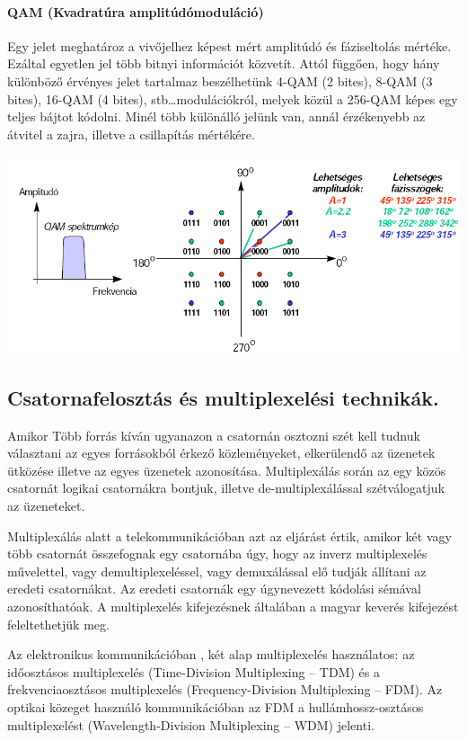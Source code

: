 \paragraph{QAM (Kvadratúra amplitúdómoduláció)}
Egy jelet meghatároz a vivőjelhez képest mért amplitúdó és fáziseltolás mértéke. Ezáltal egyetlen jel több bitnyi információt közvetít. Attól függően, hogy hány különböző érvényes jelet tartalmaz beszélhetünk 4-QAM (2 bites), 8-QAM (3 bites), 16-QAM (4 bites), stb\dots modulációkról, melyek közül a 256-QAM képes egy teljes bájtot kódolni. Minél több különálló jelünk van, annál érzékenyebb az átvitel a zajra, illetve a csillapítás mértékére.
\begin{center}
	\includegraphics[width=0.7\linewidth]{fig/12-QAM}
\end{center}


\subsection{Csatornafelosztás és multiplexelési technikák.}
Amikor Több forrás kíván ugyanazon a csatornán osztozni szét kell tudnuk választani az egyes forrásokból érkező közleményeket, elkerülendő az üzenetek ütközése illetve az egyes üzenetek azonosítása. Multiplexálás során az egy közös csatornát logikai csatornákra bontjuk, illetve de-multiplexálással szétválogatjuk az üzeneteket.

Multiplexálás alatt a telekommunikációban azt az eljárást értik, amikor két vagy
több csatornát összefognak egy csatornába úgy, hogy az inverz multiplexelés művelettel, vagy demultiplexeléssel, vagy demuxálással elő tudják állítani az eredeti csatornákat. Az eredeti csatornák egy úgynevezett kódolási sémával azonosíthatóak. A multiplexelés kifejezésnek általában a magyar keverés kifejezést feleltethetjük meg. 

Az elektronikus kommunikációban , két alap multiplexelés használatos: az időosztásos multiplexelés (Time-Division Multiplexing -- TDM) és a frekvenciaosztásos multiplexelés (Frequency-Division Multiplexing -- FDM). Az
optikai közeget használó kommunikációban az FDM a hullámhossz-osztásos multiplexelést (Wavelength-Division Multiplexing -- WDM) jelenti.


